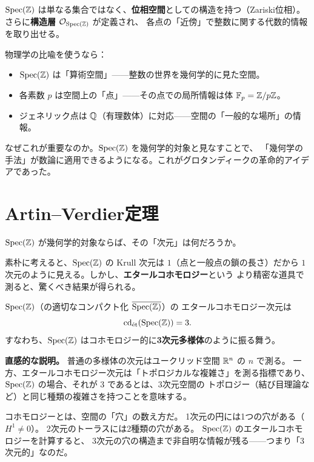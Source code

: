 $\operatorname{Spec}(\mathbb{Z})$ は単なる集合ではなく、\textbf{位相空間}としての構造を持つ（Zariski位相）。
さらに\textbf{構造層} $\mathcal{O}_{\operatorname{Spec}(\mathbb{Z})}$ が定義され、
各点の「近傍」で整数に関する代数的情報を取り出せる。

物理学の比喩を使うなら：
\begin{itemize}
  \item $\operatorname{Spec}(\mathbb{Z})$ は「算術空間」——整数の世界を幾何学的に見た空間。
  \item 各素数 $p$ は空間上の「点」——その点での局所情報は体 $\mathbb{F}_p = \mathbb{Z}/p\mathbb{Z}$。
  \item ジェネリック点は $\mathbb{Q}$（有理数体）に対応——空間の「一般的な場所」の情報。
\end{itemize}

なぜこれが重要なのか。$\operatorname{Spec}(\mathbb{Z})$ を幾何学的対象と見なすことで、
「幾何学の手法」が数論に適用できるようになる。これがグロタンディークの革命的アイデアであった。

\section{Artin--Verdier定理}
\label{sec:1.4}

$\operatorname{Spec}(\mathbb{Z})$ が幾何学的対象ならば、その「次元」は何だろうか。

素朴に考えると、$\operatorname{Spec}(\mathbb{Z})$ の Krull 次元は $1$（点と一般点の鎖の長さ）だから
$1$ 次元のように見える。しかし、\textbf{エタールコホモロジー}という
より精密な道具で測ると、驚くべき結果が得られる。

\begin{keybox}
$\operatorname{Spec}(\mathbb{Z})$（の適切なコンパクト化 $\overline{\operatorname{Spec}(\mathbb{Z})}$）の
エタールコホモロジー次元は
\[
  \operatorname{cd}_{\text{\'et}}(\operatorname{Spec}(\mathbb{Z})) = 3.
\]
すなわち、$\operatorname{Spec}(\mathbb{Z})$ はコホモロジー的に\textbf{3次元多様体}のように振る舞う。
\end{keybox}

\noindent\textbf{直感的な説明。}
普通の多様体の次元はユークリッド空間 $\mathbb{R}^n$ の $n$ で測る。
一方、エタールコホモロジー次元は「トポロジカルな複雑さ」を測る指標であり、
$\operatorname{Spec}(\mathbb{Z})$ の場合、それが $3$ であるとは、$3$次元空間の
トポロジー（結び目理論など）と同じ種類の複雑さを持つことを意味する。

\begin{hsbox}
コホモロジーとは、空間の「穴」の数え方だ。
1次元の円には1つの穴がある（$H^1 \neq 0$）。
2次元のトーラスには2種類の穴がある。
$\operatorname{Spec}(\mathbb{Z})$ のエタールコホモロジーを計算すると、
$3$次元の穴の構造まで非自明な情報が残る——つまり「3次元的」なのだ。
\end{hsbox}

